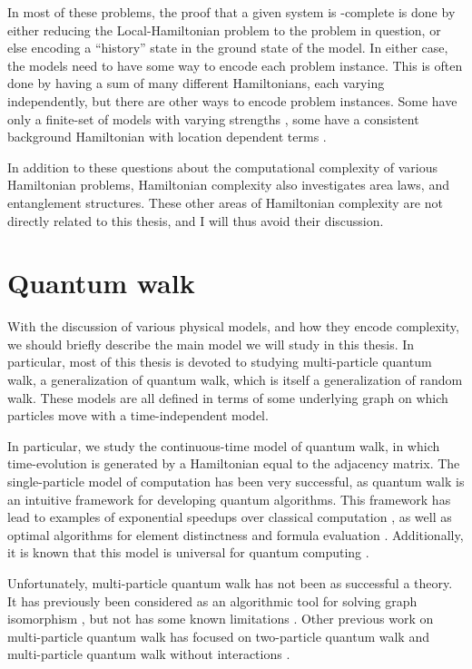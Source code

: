 \documentclass[../thesis-main/thesis-main]{subfiles}
\begin{document}
In most of these problems, the proof that a given system is \QMA-complete is done by either reducing the Local-Hamiltonian problem to the problem in question, or else encoding a ``history'' state in the ground state of the model.  In either case, the models need to have some way to encode each problem instance.  This is often done by having a sum of many different Hamiltonians, each varying independently, but there are other ways to encode problem instances.  Some have only a finite-set of models with varying strengths \cite{CM13}, some have a consistent background Hamiltonian with location dependent terms \cite{SV09}. 

In addition to these questions about the computational complexity of various Hamiltonian problems, Hamiltonian complexity also investigates area laws, and entanglement structures.  These other areas of Hamiltonian complexity are not directly related to this thesis, and I will thus avoid their discussion.



\section{Quantum walk}

With the discussion of various physical models, and how they encode complexity, we should briefly describe the main model we will study in this thesis.  In particular, most of this thesis is devoted to studying multi-particle quantum walk, a generalization of quantum walk, which is itself a generalization of random walk.  These models are all defined in terms of some underlying graph on which particles move with a time-independent model.  

In particular, we study the continuous-time model of quantum walk, in which time-evolution is generated by a Hamiltonian equal to the adjacency matrix.  The single-particle model of computation has been very successful, as quantum walk is an intuitive framework for developing quantum algorithms. This framework has lead to examples of exponential speedups over classical computation \cite{CCDFGS03}, as well as optimal algorithms for element distinctness \cite{Amb07} and formula evaluation \cite{FGG08}.  Additionally, it is known that this model is universal for quantum computing \cite{Chi09}.

Unfortunately, multi-particle quantum walk has not been as successful a theory.   It has previously been considered as an algorithmic tool for solving graph isomorphism \cite{gamble2010}, but not has some known limitations \cite{Smi11}. Other previous work on multi-particle quantum walk has focused on two-particle quantum walk \cite{sheridan2006,PA07,BLMS09,PLM10,OBB11,lahini2012,SSVMCRO12} and multi-particle quantum walk without interactions \cite{sheridan2006,PA07,BLMS09,PLM10,OBB11,Rohde11}. 
\end{document}
